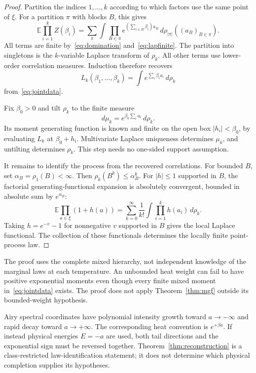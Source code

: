 \documentclass[11pt,a4paper]{article}
\theoremstyle{remark}\newtheorem{remark}[theorem]{Remark}
\newcommand{\E}{\mathbb E}
\begin{document}
\begin{proof}
Partition the indices $1,\ldots,k$ according to which factors use the same point of $\xi$.
For a partition $\pi$ with blocks $B$, this gives
\begin{equation}\label{eq:partition}
 \E\prod_{i=1}^kZ(\beta_i)
 =\sum_{\pi}\int\prod_{B\in\pi}
 e^{(\sum_{i\in B}\beta_i)a_B}\,d\rho_{|\pi|}((a_B)_{B\in\pi}).
\end{equation}
All terms are finite by~\eqref{eq:domination} and~\eqref{eq:lapfinite}.
The partition into singletons is the $k$-variable Laplace transform of $\rho_k$.
All other terms use lower-order correlation measures.
Induction therefore recovers
\begin{equation}
 L_k(\beta_1,\ldots,\beta_k)
 =\int e^{\sum_i\beta_i a_i}\,d\rho_k
\end{equation}
from~\eqref{eq:jointdata}.

Fix $\beta_0>0$ and tilt $\rho_k$ to the finite measure
\begin{equation}
 d\mu_k=e^{\beta_0\sum_i a_i}\,d\rho_k.
\end{equation}
Its moment generating function is known and finite on the open box $|h_i|<\beta_0$, by evaluating $L_k$ at $\beta_0+h_i$.
Multivariate Laplace uniqueness determines $\mu_k$, and untilting determines $\rho_k$.
This step needs no one-sided support assumption.

It remains to identify the process from the recovered correlations.
For bounded $B$, set $\alpha_B=\rho_1(B)<\infty$.
Then $\rho_k(B^k)\le\alpha_B^k$.
For $|h|\le1$ supported in $B$, the factorial generating-functional expansion is absolutely convergent, bounded in absolute sum by $e^{\alpha_B}$:
\begin{equation}
 \E\prod_{a\in\xi}(1+h(a))
 =\sum_{k=0}^{\infty}\frac1{k!}\int\prod_{i=1}^kh(a_i)\,d\rho_k.
\end{equation}
Taking $h=e^{-v}-1$ for nonnegative $v$ supported in $B$ gives the local Laplace functional.
The collection of these functionals determines the locally finite point-process law.
\end{proof}

The proof uses the complete mixed hierarchy, not independent knowledge of the marginal laws at each temperature.
An unbounded heat weight can fail to have positive exponential moments even though every finite mixed moment in~\eqref{eq:jointdata} exists.
The proof does not apply Theorem~\ref{thm:mgf} outside its bounded-weight hypothesis.

Airy spectral coordinates have polynomial intensity growth toward $a\to-\infty$ and rapid decay toward $a\to+\infty$.
The corresponding heat convention is $e^{+\beta a}$.
If instead physical energies $E=-a$ are used, both tail directions and the exponential sign must be reversed together.
Theorem~\ref{thm:reconstruction} is a class-restricted law-identification statement; it does not determine which physical completion supplies its hypotheses.
\end{document}
